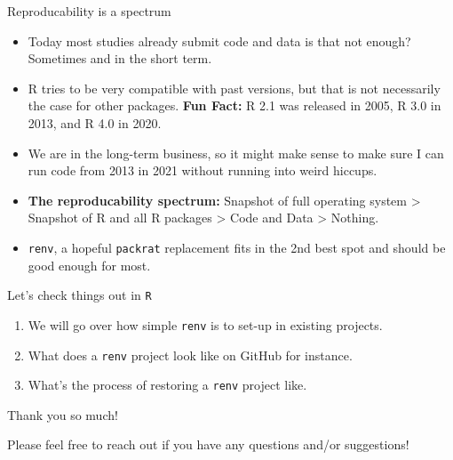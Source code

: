 \documentclass[aspectratio=169,xcolor=dvipsnames]{beamer}\usepackage[]{graphicx}\usepackage[]{color}
\begin{document}
\begin{frame}[t]{Reproducability is a spectrum}
  \begin{itemize}
    \item Today most studies already submit code and data is that not enough? \pause Sometimes and in the short term. \pause
    \item R tries to be very compatible with past versions, but that is not necessarily the case for other packages. \textbf{Fun Fact:} R 2.1 was released in 2005, R 3.0 in 2013, and R 4.0 in 2020. \pause
    \item We are in the long-term business, so it might make sense to make sure I can run code from 2013 in 2021 \alert{without running into weird hiccups}.\pause
    \item \textbf{The reproducability spectrum:} Snapshot of full operating system \pause > Snapshot of R and all R packages \pause > Code and Data \pause > Nothing. \pause
    \item \texttt{renv}, a hopeful \texttt{packrat} replacement fits in the 2nd best spot and should be good enough for most.
  \end{itemize}
\end{frame}


\begin{frame}[t]{Let's check things out in \texttt{R}}
  \begin{enumerate}
    \item We will go over how simple \texttt{renv} is to set-up in existing projects.\pause\vspace{1em}
    \item What does a \texttt{renv} project look like on GitHub for instance.\pause\vspace{1em}
    \item What's the process of restoring a \texttt{renv} project like.
  \end{enumerate}
\end{frame}


\begin{frame}[t]{Thank you so much!}
  \vspace{3em}
  \begin{center}
    \begin{Large}
      Please feel free to reach out if you have any questions and/or suggestions!
    \end{Large}
  \end{center}
\end{frame}
\end{document}
